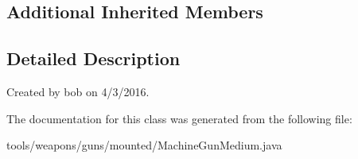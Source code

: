 \subsection*{Additional Inherited Members}


\subsection{Detailed Description}
Created by bob on 4/3/2016. 

The documentation for this class was generated from the following file\+:\begin{DoxyCompactItemize}
\item 
tools/weapons/guns/mounted/Machine\+Gun\+Medium.\+java\end{DoxyCompactItemize}
